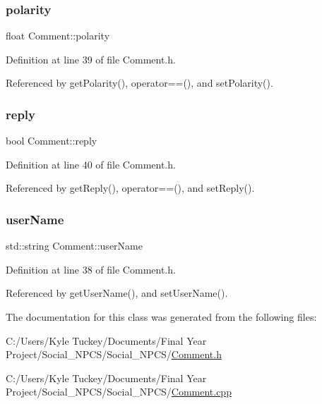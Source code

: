 \mbox{\label{class_comment_a617b67425b39c1f5f1eb0ada3d4bbd74}} 
\subsubsection{\texorpdfstring{polarity}{polarity}}
{\footnotesize\ttfamily float Comment\+::polarity\hspace{0.3cm}{\ttfamily [private]}}



Definition at line 39 of file Comment.\+h.



Referenced by get\+Polarity(), operator==(), and set\+Polarity().

\mbox{\label{class_comment_a7b8ceeb67364d5e08299baeeff38ba03}} 
\subsubsection{\texorpdfstring{reply}{reply}}
{\footnotesize\ttfamily bool Comment\+::reply\hspace{0.3cm}{\ttfamily [private]}}



Definition at line 40 of file Comment.\+h.



Referenced by get\+Reply(), operator==(), and set\+Reply().

\mbox{\label{class_comment_ad477f53e20e76aa9352926f93ccc7a56}} 
\subsubsection{\texorpdfstring{user\+Name}{userName}}
{\footnotesize\ttfamily std\+::string Comment\+::user\+Name\hspace{0.3cm}{\ttfamily [private]}}



Definition at line 38 of file Comment.\+h.



Referenced by get\+User\+Name(), and set\+User\+Name().



The documentation for this class was generated from the following files\+:\begin{DoxyCompactItemize}
\item 
C\+:/\+Users/\+Kyle Tuckey/\+Documents/\+Final Year Project/\+Social\+\_\+\+N\+P\+C\+S/\+Social\+\_\+\+N\+P\+C\+S/\hyperlink{_comment_8h}{Comment.\+h}\item 
C\+:/\+Users/\+Kyle Tuckey/\+Documents/\+Final Year Project/\+Social\+\_\+\+N\+P\+C\+S/\+Social\+\_\+\+N\+P\+C\+S/\hyperlink{_comment_8cpp}{Comment.\+cpp}\end{DoxyCompactItemize}
